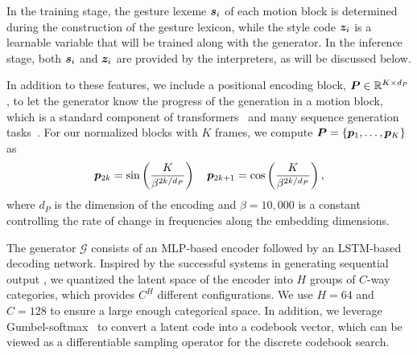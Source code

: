 In the training stage, the gesture lexeme $\bm{s}_i$ of each motion block is determined during the construction of the gesture lexicon, while the style code $\bm{z}_i$ is a learnable variable that will be trained along with the generator. In the inference stage, both $\bm{s}_i$ and $\bm{z}_i$ are provided by the interpreters, as will be discussed below.

In addition to these features, we include a positional encoding block, $\bm{P}\in\mathbb{R}^{K\times{}d_{P}}$, to let the generator know the progress of the generation in a motion block, which is a standard component of transformers~\cite{Vaswani2017_Attentiona} and many sequence generation tasks~\cite{Harvey2020_motionInBetween}. For our normalized blocks with $K$ frames, we compute $\bm{P}=\{\bm{p}_1,\dots,\bm{p}_K\}$ as
\begin{align}
    \bm{p}_{2k} = \sin\left(\frac{K}{\beta^{2k/d_{P}}}\right) \quad
    \bm{p}_{2k+1} = \cos\left(\frac{K}{\beta^{2k/d_{P}}}\right),
    \label{eqn:pos_enc}
\end{align}
where $d_{P}$ is the dimension of the encoding and $\beta=10,000$ is a constant controlling the rate of change in frequencies along the embedding dimensions.

The generator $\mathcal{G}$ consists of an MLP-based encoder followed by an LSTM-based decoding network. Inspired by the successful systems in generating sequential output \cite{richard2021meshtalk,oord2017neural}, we quantized the latent space of the encoder into $H$ groups of $C$-way categories, which provides $C^H$ different configurations. We use $H=64$ and $C=128$ to ensure a large enough categorical space. In addition, we leverage Gumbel-softmax~\cite{jang2017categorical} to convert a latent code into a codebook vector, which can be viewed as a differentiable sampling operator for the discrete codebook search.

